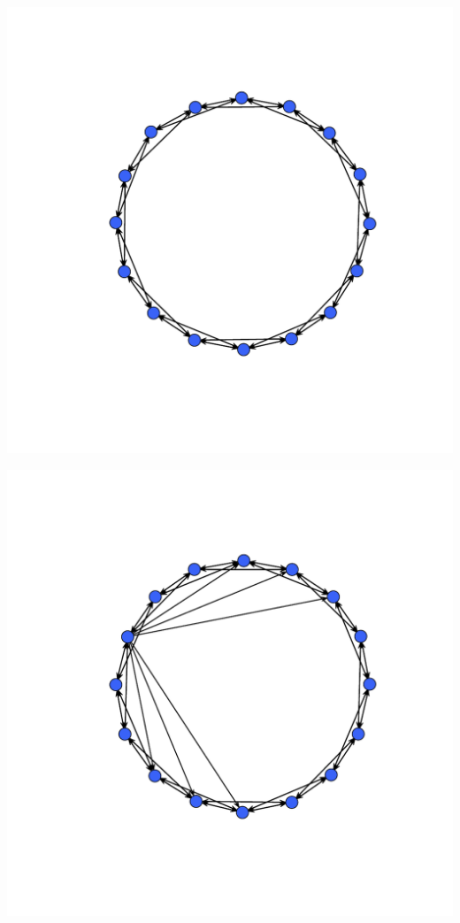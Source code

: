 \documentclass{beamer}
\begin{document}
\begin{frame}
\begin{center}
\includegraphics[width=.6\textwidth]{circle.pdf}
\end{center}
\end{frame}

\begin{frame}
\begin{center}
\includegraphics[width=.6\textwidth]{circle_w_invader.pdf}
\end{center}
\end{frame}
\end{document}
